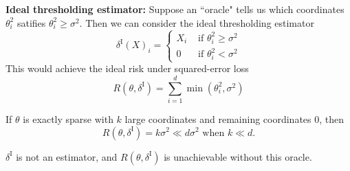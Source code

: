 \documentclass[a4paper]{article}
\begin{document}
\begin{center}
\end{center}

\noindent \textbf{Ideal thresholding estimator:} Suppose an ``oracle" tells us which coordinates $\theta_i^2$ satifies $\theta_i^2 \geq \sigma^2$. Then we can consider the ideal thresholding estimator
\begin{equation}
	\delta^{\text{I}}(X)_i = 
	\left\{
	\begin{array}{ll}
		X_i & \text{ if } \theta_i^2 \geq \sigma^2 \\
		0 & \text{ if } \theta_i^2 < \sigma^2 
	\end{array}\right.
\end{equation}
This would achieve the ideal risk under squared-error loss
\begin{equation}
	R(\theta,\delta^{\text{I}}) = \sum\limits_{i=1}^d \min(\theta_i^2,\sigma^2)
\end{equation}

\begin{eg}
	If $\theta$ is exactly sparse with $k$ large coordinates and remaining coordinates $0$, then
	\begin{equation}
		R(\theta,\delta^{\text{I}}) = k\sigma^2 \ll d\sigma^2 \text{ when } k \ll d.
	\end{equation}
\end{eg}

\begin{note}
	$\delta^{\text{I}}$ is not an estimator, and $R(\theta,\delta^{\text{I}})$ is unachievable without this oracle.
\end{note}
\end{document}
